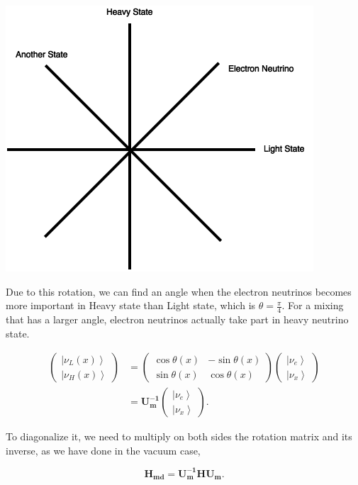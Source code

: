 \documentclass{tufte-handout}
\newcommand{\ket}[1]{\left| #1\right\rangle}
\begin{document}
\begin{marginfigure}
\includegraphics{assets/heavyLightRotation}
\caption{Due to this rotation, we can find an angle when the electron neutrinos becomes more important in Heavy state than Light state, which is $\theta=\frac{\pi}{4}$. For a mixing that has a larger angle, electron neutrinos actually take part in heavy neutrino state.}
\end{marginfigure}


\begin{align*}
\begin{pmatrix} \ket{\nu_L(x)} \\ \ket{\nu_H(x)} \end{pmatrix} &= \begin{pmatrix} \cos \theta(x) & -\sin\theta(x) \\ \sin\theta(x) & \cos\theta(x) \end{pmatrix} \begin{pmatrix}\ket{\nu_e} \\ \ket{\nu_x} \end{pmatrix} \\
& = \mathbf{U^{-1}_m } \begin{pmatrix}\ket{\nu_e} \\ \ket{\nu_x} \end{pmatrix} .
\end{align*}



To diagonalize it, we need to multiply on both sides the rotation matrix and its inverse, as we have done in the vacuum case,


\begin{equation*}
\mathbf {H_{md}} = \mathbf{U_m^{-1}} \mathbf H \mathbf {U_m}.
\end{equation*}
\end{document}
